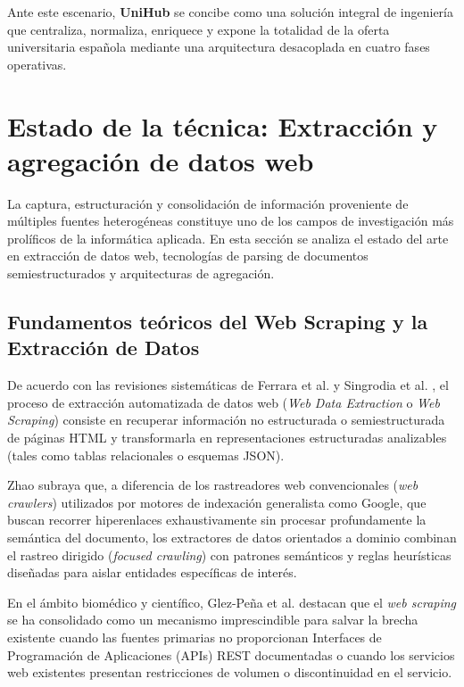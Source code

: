 \noindent Ante este escenario, \textbf{UniHub} se concibe como una solución integral de ingeniería que centraliza, normaliza, enriquece y expone la totalidad de la oferta universitaria española mediante una arquitectura desacoplada en cuatro fases operativas.

\section{Estado de la técnica: Extracción y agregación de datos web}
La captura, estructuración y consolidación de información proveniente de múltiples fuentes heterogéneas constituye uno de los campos de investigación más prolíficos de la informática aplicada. En esta sección se analiza el estado del arte en extracción de datos web, tecnologías de parsing de documentos semiestructurados y arquitecturas de agregación.

\subsection{Fundamentos teóricos del Web Scraping y la Extracción de Datos}
De acuerdo con las revisiones sistemáticas de Ferrara et al. \cite{ferrara2014web} y Singrodia et al. \cite{singrodia2019review}, el proceso de extracción automatizada de datos web (\textit{Web Data Extraction} o \textit{Web Scraping}) consiste en recuperar información no estructurada o semiestructurada de páginas HTML y transformarla en representaciones estructuradas analizables (tales como tablas relacionales o esquemas JSON). 

Zhao \cite{zhao2017web} subraya que, a diferencia de los rastreadores web convencionales (\textit{web crawlers}) utilizados por motores de indexación generalista como Google, que buscan recorrer hiperenlaces exhaustivamente sin procesar profundamente la semántica del documento, los extractores de datos orientados a dominio combinan el rastreo dirigido (\textit{focused crawling}) con patrones semánticos y reglas heurísticas diseñadas para aislar entidades específicas de interés.

En el ámbito biomédico y científico, Glez-Peña et al. \cite{glez2014web} destacan que el \textit{web scraping} se ha consolidado como un mecanismo imprescindible para salvar la brecha existente cuando las fuentes primarias no proporcionan Interfaces de Programación de Aplicaciones (APIs) REST documentadas o cuando los servicios web existentes presentan restricciones de volumen o discontinuidad en el servicio.

